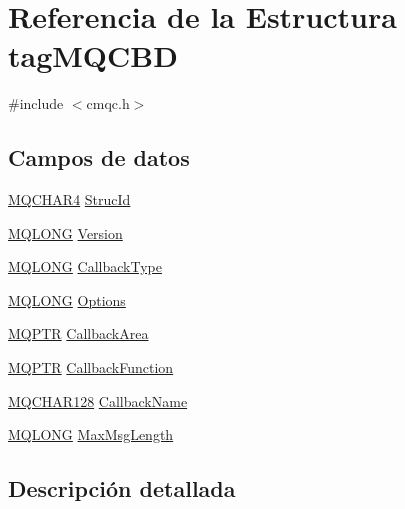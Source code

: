 \hypertarget{structtag_m_q_c_b_d}{}\section{Referencia de la Estructura tag\+M\+Q\+C\+B\+D}
\label{structtag_m_q_c_b_d}


{\ttfamily \#include $<$cmqc.\+h$>$}

\subsection*{Campos de datos}
\begin{DoxyCompactItemize}
\item 
\hyperlink{cmqc_8h_a12590e546ed66fda7cf21c1d5cefa31d}{M\+Q\+C\+H\+A\+R4} \hyperlink{structtag_m_q_c_b_d_a0530922ca944569b52601d74941f96e4}{Struc\+Id}
\item 
\hyperlink{cmqc_8h_a1fb8d28cbda3fa8766a9821230cdb6d5}{M\+Q\+L\+O\+N\+G} \hyperlink{structtag_m_q_c_b_d_a0656ef8f766b3907d394d88a35d7b7e9}{Version}
\item 
\hyperlink{cmqc_8h_a1fb8d28cbda3fa8766a9821230cdb6d5}{M\+Q\+L\+O\+N\+G} \hyperlink{structtag_m_q_c_b_d_ae3bab36f44b94fe301ca31e17eb7a0e4}{Callback\+Type}
\item 
\hyperlink{cmqc_8h_a1fb8d28cbda3fa8766a9821230cdb6d5}{M\+Q\+L\+O\+N\+G} \hyperlink{structtag_m_q_c_b_d_ad7aff2d6c6044809464380998d24ec5c}{Options}
\item 
\hyperlink{cmqc_8h_a0b835d8e479d7c42242ed9c6b6572f5a}{M\+Q\+P\+T\+R} \hyperlink{structtag_m_q_c_b_d_aec315c62e18aa72c5d04cadada50f160}{Callback\+Area}
\item 
\hyperlink{cmqc_8h_a0b835d8e479d7c42242ed9c6b6572f5a}{M\+Q\+P\+T\+R} \hyperlink{structtag_m_q_c_b_d_aed9b3cdc59679c9be14dc5dc693f3ac0}{Callback\+Function}
\item 
\hyperlink{cmqc_8h_a7eddcc829f1a614d1a8d2aa5dc2e822d}{M\+Q\+C\+H\+A\+R128} \hyperlink{structtag_m_q_c_b_d_a912dafe7212efcbdb457883a53cf7010}{Callback\+Name}
\item 
\hyperlink{cmqc_8h_a1fb8d28cbda3fa8766a9821230cdb6d5}{M\+Q\+L\+O\+N\+G} \hyperlink{structtag_m_q_c_b_d_ae36dc482f00cf723ee5d9302dd75c620}{Max\+Msg\+Length}
\end{DoxyCompactItemize}


\subsection{Descripción detallada}


